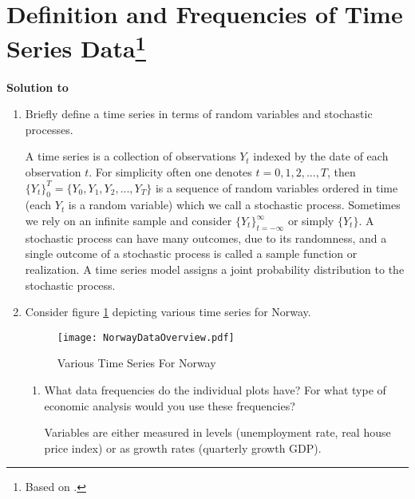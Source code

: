 \documentclass[a4paper]{scrartcl}
\begin{document}
    \section[Definition and Frequencies of Time Series Data]{Definition and Frequencies of Time Series Data\footnote{Based on \citet[Ch.~2]{BjornlandThorsrud.2015}.}}\label{ex:DefFreqTS}
    \begin{solution}\textbf{Solution to }
    \end{solution}
    \begin{enumerate}
        \item Briefly define a time series in terms of random variables and stochastic processes.
              \begin{solution}
                  A time series is a collection of observations $Y_t$ indexed by the date of each observation $t$. For simplicity often one denotes $t=0,1,2,...,T$, then $\{Y_t\}_0^T = \{Y_0,Y_1,Y_2,...,Y_T\}$ is a sequence of random variables ordered in time (each $Y_t$ is a random variable) which we call a stochastic process. Sometimes we rely on an infinite sample and consider $\{Y_t\}_{t=-\infty}^\infty$ or simply $\{Y_t\}$. A stochastic process can have many outcomes, due to its randomness, and a single outcome of a stochastic process is called a sample function or realization. A time series model assigns a joint probability distribution to the stochastic process.
              \end{solution}
              
        \item Consider figure \ref{fig:NorwayData} depicting various time series for Norway.
              \begin{figure}[h]
                  \centering
                  \texttt{[image: NorwayDataOverview.pdf]}
                  \caption{Various Time Series For Norway}
                  \label{fig:NorwayData}
              \end{figure}
              \begin{enumerate}
                  \item What data frequencies do the individual plots have? For what type of economic analysis would you use these frequencies?
                        \begin{solution}
                            Variables are either measured in levels (unemployment rate, real house price index) or as growth rates (quarterly growth GDP).
                            

\end{solution}
\end{enumerate}
\end{enumerate}
\end{document}
